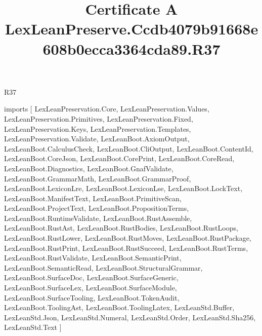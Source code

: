 \begin{lexlean}{R37}
\title{Certificate A LexLeanPreserve.Ccdb4079b91668e608b0ecca3364cda89.R37}
\begin{coremodule}
imports [
  LexLeanPreservation.Core,
  LexLeanPreservation.Values,
  LexLeanPreservation.Primitives,
  LexLeanPreservation.Fixed,
  LexLeanPreservation.Keys,
  LexLeanPreservation.Templates,
  LexLeanPreservation.Validate,
  LexLeanBoot.AxiomOutput,
  LexLeanBoot.CalculusCheck,
  LexLeanBoot.CliOutput,
  LexLeanBoot.ContentId,
  LexLeanBoot.CoreJson,
  LexLeanBoot.CorePrint,
  LexLeanBoot.CoreRead,
  LexLeanBoot.Diagnostics,
  LexLeanBoot.GnafValidate,
  LexLeanBoot.GrammarMath,
  LexLeanBoot.GrammarProof,
  LexLeanBoot.LexiconLre,
  LexLeanBoot.LexiconLse,
  LexLeanBoot.LockText,
  LexLeanBoot.ManifestText,
  LexLeanBoot.PrimitiveScan,
  LexLeanBoot.ProjectText,
  LexLeanBoot.PropositionTerms,
  LexLeanBoot.RuntimeValidate,
  LexLeanBoot.RustAssemble,
  LexLeanBoot.RustAst,
  LexLeanBoot.RustBodies,
  LexLeanBoot.RustLoops,
  LexLeanBoot.RustLower,
  LexLeanBoot.RustMoves,
  LexLeanBoot.RustPackage,
  LexLeanBoot.RustPrint,
  LexLeanBoot.RustSucceed,
  LexLeanBoot.RustTerms,
  LexLeanBoot.RustValidate,
  LexLeanBoot.SemanticPrint,
  LexLeanBoot.SemanticRead,
  LexLeanBoot.StructuralGrammar,
  LexLeanBoot.SurfaceDoc,
  LexLeanBoot.SurfaceGeneric,
  LexLeanBoot.SurfaceLex,
  LexLeanBoot.SurfaceModule,
  LexLeanBoot.SurfaceTooling,
  LexLeanBoot.TokenAudit,
  LexLeanBoot.ToolingAst,
  LexLeanBoot.ToolingLatex,
  LexLeanStd.Buffer,
  LexLeanStd.Json,
  LexLeanStd.Numeral,
  LexLeanStd.Order,
  LexLeanStd.Sha256,
  LexLeanStd.Text
]


\end{coremodule}
\end{lexlean}
